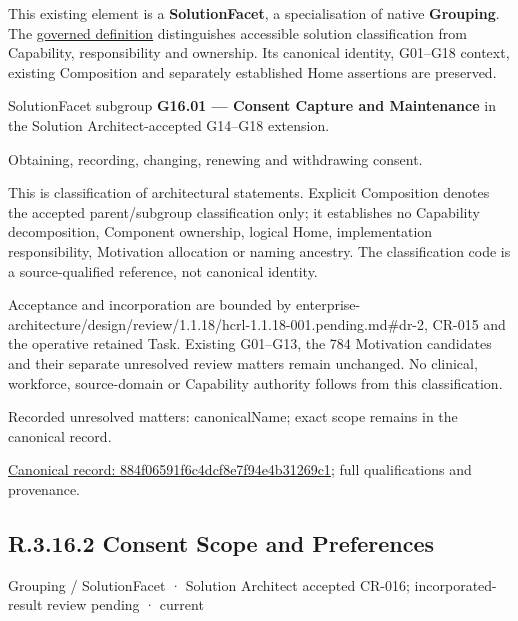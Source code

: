 This existing element is a \textbf{SolutionFacet}, a specialisation of native
\textbf{Grouping}. The \href{\detokenize{../../../../../../../governance/continuum-representation.md#solutionfacet-classification--1119-candidate}}{governed definition}
distinguishes accessible solution classification from Capability, responsibility
and ownership. Its canonical identity, G01–G18 context, existing Composition
and separately established Home assertions are preserved.



SolutionFacet subgroup \textbf{G16.01 — Consent Capture and Maintenance} in the Solution Architect-accepted G14–G18 extension.



Obtaining, recording, changing, renewing and withdrawing consent.



This is classification of architectural statements. Explicit Composition denotes the accepted parent/subgroup classification only; it establishes no Capability decomposition, Component ownership, logical Home, implementation responsibility, Motivation allocation or naming ancestry. The classification code is a source-qualified reference, not canonical identity.



Acceptance and incorporation are bounded by enterprise-architecture/design/review/1.1.18/hcrl-1.1.18-001.pending.md\#dr-2, CR-015 and the operative retained Task. Existing G01–G13, the 784 Motivation candidates and their separate unresolved review matters remain unchanged. No clinical, workforce, source-domain or Capability authority follows from this classification.


{\small Recorded unresolved matters: canonicalName; exact scope remains in the canonical record.}\par
{\footnotesize \href{../../../../../../../continuum/grouping/884f06591f6c4dcf8e7f94e4b31269c1.md}{Canonical record: 884f06591f6c4dcf8e7f94e4b31269c1}; full qualifications and provenance.}\par
\subsection*{R.3.16.2 Consent Scope and Preferences}
\label{navigation:R.3.16.2}

\label{element:e48346674b0740c19f4a13cc50a7ae66}
{\small Grouping / SolutionFacet · Solution Architect accepted CR-016; incorporated-result review pending · current}\par

